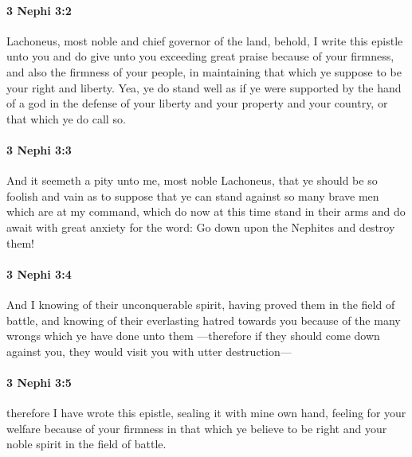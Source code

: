 		\paragraph{3 Nephi 3:2} %
			\label{3NEPHI-3-2}

			Lachoneus, most noble and chief governor of the land,
			behold, I write this epistle unto you
			and do give unto you exceeding great praise
			because of your firmness, and also the firmness of your people,
			in maintaining that which ye suppose to be your right and liberty.
			Yea, ye do stand well as if ye were supported by the hand of a god
			in the defense of your liberty and your property and your country,
			or that which ye do call so.

		\paragraph{3 Nephi 3:3} %
			\label{3NEPHI-3-3}

			And it seemeth a pity unto me, most noble Lachoneus,
			that ye should be so foolish and vain as to suppose
			that ye can stand against so many brave men which are at my command,
			which do now at this time stand in their arms
			and do await with great anxiety for the word:
			Go down upon the Nephites and destroy them!

		\paragraph{3 Nephi 3:4} %
			\label{3NEPHI-3-4}

			And I knowing of their unconquerable spirit,
			having proved them in the field of battle,
			and knowing of their everlasting hatred towards you
			because of the many wrongs which ye have done unto them
			---therefore if they should come down against you,
			they would visit you with utter destruction---

		\paragraph{3 Nephi 3:5} %
			\label{3NEPHI-3-5}

			therefore I have wrote this epistle,
			sealing it with mine own hand,
			feeling for your welfare
			because of your firmness in that which ye believe to be right
			and your noble spirit in the field of battle.

